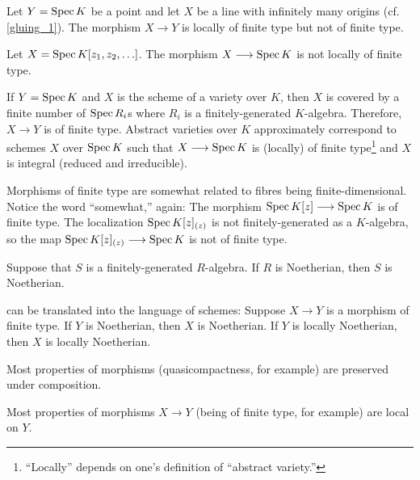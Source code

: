 \documentclass [11 pt, oneside] {article}
\begin{document}
\begin{example}[ ]\label{}\text{}
Let $Y=\operatorname{Spec} K$ be a point and let $X$ be a line with infinitely many origins (cf. \cref{gluing_1}). The morphism $X\longrightarrow Y$ is locally of finite type but not of finite type.
\end{example}

\begin{example}[ ]\label{}\text{}
Let $X =\operatorname{Spec} K[z_1,z_2,\hdots]$. The morphism $X \longrightarrow \operatorname{Spec} K$ is not locally of finite type.
\end{example}

If $Y=\operatorname{Spec} K$ and $X $ is the scheme of a variety over $K$, then $X$ is covered by a finite number of $\operatorname{Spec} R_i$s where $R_i$ is a finitely-generated $K$-algebra. Therefore, $X \longrightarrow Y$ is of finite type. Abstract varieties over $K$ approximately correspond to schemes $X$ over $\operatorname{Spec} K$ such that $X\longrightarrow \operatorname{Spec} K$ is (locally) of finite type\footnote{``Locally'' depends on one's definition of ``abstract variety.''} and $X$ is integral (reduced and irreducible). 

Morphisms of finite type are somewhat related to fibres being finite-dimensional. Notice the word ``somewhat,'' again: The morphism $\operatorname{Spec} K[z] \longrightarrow \operatorname{Spec} K$ is of finite type. The localization $\operatorname{Spec} K[z]_{(z)}$ is not finitely-generated as a $K$-algebra, so the map $\operatorname{Spec} K[z]_{(z)} \longrightarrow \operatorname{Spec} K$ is not of finite type.

\begin{theorem}[Hilbert]\label{htheo}\text{}
Suppose that $S$ is a finitely-generated $R$-algebra. If $R$ is Noetherian, then $S$ is Noetherian.
\end{theorem}

\begin{remark}
	 can be translated into the language of schemes: Suppose $X\longrightarrow Y$ is a morphism of finite type. If $Y$ is Noetherian, then $X$ is Noetherian. If $Y$ is locally Noetherian, then $X$ is locally Noetherian.
\end{remark}

\begin{remark}
	Most properties of morphisms (quasicompactness, for example) are preserved under composition.
\end{remark}

\begin{remark}
	Most properties of morphisms $X\longrightarrow Y$ (being of finite type, for example) are local on $Y$.
\end{remark}
\end{document}

